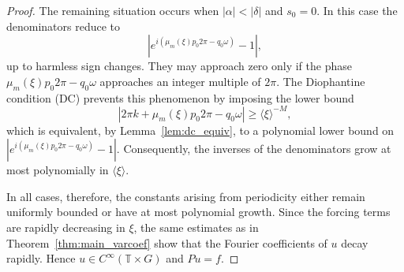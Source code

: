 \documentclass[10pt,a4paper]{amsart}
\begin{document}
\begin{proof}
		The remaining situation occurs when $|\alpha|<|\delta|$ and $s_0=0$.
		In this case the denominators reduce to
		\[
		|e^{i(\mu_m(\xi)p_0 2\pi-q_0\omega)}-1|,
		\]
		up to harmless sign changes.
		They may approach zero only if the phase
		$\mu_m(\xi)p_0 2\pi-q_0\omega$
		approaches an integer multiple of $2\pi$.
		The Diophantine condition (DC) prevents this phenomenon
		by imposing the lower bound
		\[
		|2\pi k+\mu_m(\xi)p_0 2\pi-q_0\omega|
		\ge \langle\xi\rangle^{-M},
		\]
		which is equivalent, by Lemma~\ref{lem:dc_equiv},
		to a polynomial lower bound on
		$|e^{i(\mu_m(\xi)p_0 2\pi-q_0\omega)}-1|$.
		Consequently, the inverses of the denominators grow at most
		polynomially in $\langle\xi\rangle$.
		
		In all cases, therefore, the constants arising from periodicity
		either remain uniformly bounded or have at most polynomial growth.
		Since the forcing terms are rapidly decreasing in $\xi$,
		the same estimates as in Theorem~\ref{thm:main_varcoef}
		show that the Fourier coefficients of $u$
		decay rapidly.
		Hence $u\in C^\infty(\mathbb{T}\times G)$ and $Pu=f$.
	\end{proof}
\end{document}
